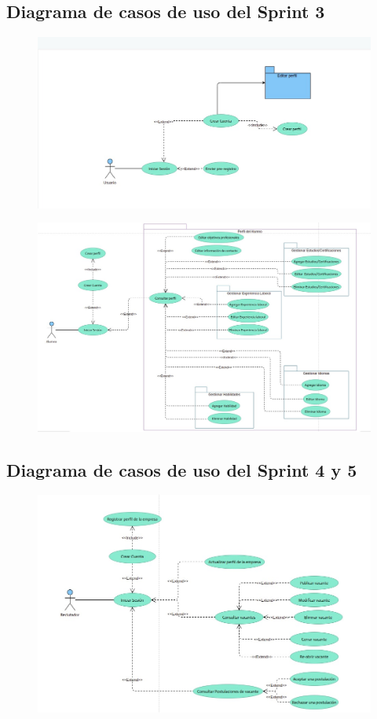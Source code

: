 \subsection{Diagrama de casos de uso del Sprint 3}
\begin{figure}[hbtp!]
	\begin{center}
		\includegraphics[width=.8\textwidth]{analisisydiseno/imagenes/cuALumno.jpeg}
	\end{center}
	\label{fig:nomenclatura}
\end{figure}

\begin{figure}[hbtp!]
	\begin{center}
		\includegraphics[width=.9\textwidth]{analisisydiseno/imagenes/cu2.jpeg}
	\end{center}
	\label{fig:nomenclatura}
\end{figure}
\clearpage
\subsection{Diagrama de casos de uso del Sprint 4 y 5}
\begin{figure}[hbtp!]
	\begin{center}
		\includegraphics[width=.7\textwidth]{analisisydiseno/imagenes/cu3.jpeg}
	\end{center}
	\label{fig:nomenclatura}
\end{figure}

